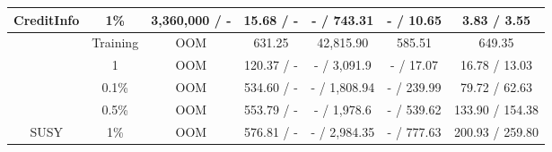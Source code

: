 \begin{wraptable}[23]{r}{.5\textwidth}
{\begin{tabular}{ccccccc}
\multirow{-5}{*}{CreditInfo}                         & 1\%                             & 3,360,000 / -                                                       & 15.68 / -                                                        & - / 743.31                                                            & - / 10.65                                                             & 3.83 / 3.55                        \\\midrule
                                                     & Training                        & OOM                                                                 & 631.25                                                           & 42,815.90                                                             & 585.51                                                                & 649.35                             \\
                                                     & 1                               & OOM                                                                 & 120.37 / -                                                       & - / 3,091.9                                                           & - / 17.07                                                             & 16.78 / 13.03                      \\
                                                     & 0.1\%                           & OOM                                                                 & 534.60 / -                                                       & - / 1,808.94                                                          & - / 239.99                                                            & 79.72 / 62.63                      \\
                                                     & 0.5\%                           & OOM                                                                 & 553.79 / -                                                       & - / 1,978.6                                                           & - / 539.62                                                            & 133.90 / 154.38                    \\
\multirow{-5}{*}{SUSY}                               & 1\%                             & OOM                                                                 & 576.81 / -                                                       & - / 2,984.35                                                          & - / 777.63                                                            & 200.93 / 259.80                    \\\midrule

\end{tabular}}
\end{wraptable}
